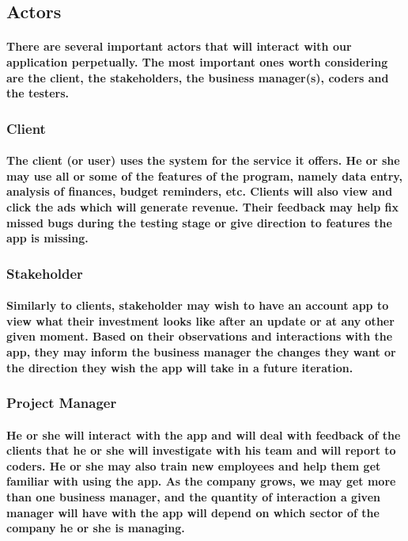 \documentclass{article}
\begin{document}
\subsection{Actors}
\paragraph{\indent There are several important actors that will interact with our application perpetually. The most important ones worth considering are the client, the stakeholders, the business manager(s), coders and the testers.}

\subsubsection{Client}
\paragraph{\indent The client (or user) uses the system for the service it offers. He or she may use all or some of the features of the program, namely data entry, analysis of finances, budget reminders, etc. Clients will also view and click the ads which will generate revenue. Their feedback may help fix missed bugs during the testing stage or give direction to features the app is missing.  }

\subsubsection{Stakeholder}
\paragraph{\indent Similarly to clients, stakeholder may wish to have an account app to view what their investment looks like after an update or at any other given moment. Based on their observations and interactions with the app, they may inform the business manager the changes they want or the direction they wish the app will take in a future iteration.}

\subsubsection{Project Manager}
\paragraph{\indent He or she will interact with the app and will deal with feedback of the clients that he or she will investigate with his team and will report to coders. He or she may also train new employees and help them get familiar with using the app. As the company grows, we may get more than one business manager, and the quantity of interaction a given manager will have with the app will depend on which sector of the company he or she is managing.}
\end{document}
